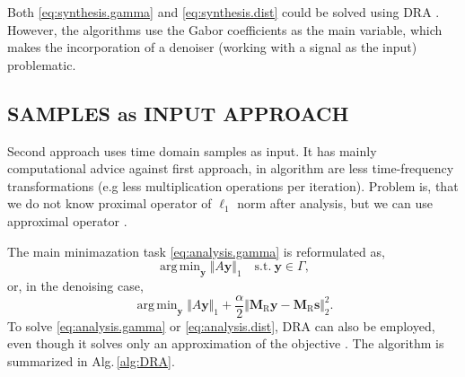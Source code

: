 \documentclass[conference]{IEEEtran}
\newcommand{\todo}[1]{\textcolor{red}{#1}}
\begin{document}
%
Both \eqref{eq:synthesis.gamma} and \eqref{eq:synthesis.dist} could be solved using DRA \cite{Mokry2020, Zaviska2021}.
However, the algorithms use the Gabor coefficients as the main variable, which makes the incorporation of a denoiser (working with a signal as the input) problematic.


\subsection{SAMPLES as INPUT APPROACH}\label{subsec:timecoef}

Second approach uses time domain samples as input.
It has mainly computational advice against first approach, in algorithm are less time-frequency transformations (e.g less multiplication operations per iteration).
Problem is, 
that we do not know proximal operator of $ \ell_1 $ norm after analysis, but we can use approximal operator \cite{Mokry2021}.

The main minimazation task \eqref{eq:analysis.gamma} is reformulated as,
\begin{equation}
	\label{eq:analysis.gamma}
	\mathop {\operatorname{arg \, min}}_\mathbf {y}\Vert A \mathbf {y}\Vert _1 \quad \text{s.t.}\ \mathbf {y}\in \Gamma,
\end{equation}
or, in the denoising case,
\begin{equation}
	\label{eq:analysis.dist}
	\mathop {\operatorname{arg \, min}}_\mathbf {y}\Vert A \mathbf {y}\Vert _1 + \frac{\alpha}{2} \Vert \mathbf{M}_{\mathrm{R}} \mathbf {y} - \mathbf{M}_{\mathrm{R}} \mathbf{s} \Vert^2_2.
\end{equation} 
To solve \eqref{eq:analysis.gamma} or \eqref{eq:analysis.dist}, DRA can also be employed, even though it solves only an approximation of the objective \cite{Mokry2021}.
The algorithm is summarized in Alg.\,\ref{alg:DRA}.
\end{document}
